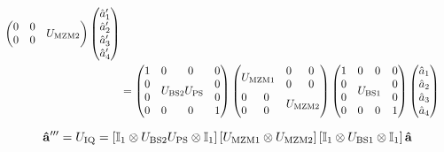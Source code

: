 \begin{equation}
\begin{split}
\begin{pmatrix}
			 0 & 0 & \multicolumn{2}{c}{\multirow{2}{*}{$U_\text{MZM2}$}} \\
			 0 & 0 & & \\
		\end{pmatrix}
		\begin{pmatrix}
			\hat{a}_1^\prime \\
			\hat{a}_2^\prime \\
			\hat{a}_3^\prime \\
			\hat{a}_4^\prime
		\end{pmatrix}
		\\
		&=
		\begin{pmatrix}
			 1 & 0 & 0 & 0 \\
			 0 & \multicolumn{2}{c}{\multirow{2}{*}{$U_\text{BS2}U_\text{PS}$}} & 0 \\
			 0 & & & 0 \\
			 0 & 0 & 0 & 1
		\end{pmatrix}
		\begin{pmatrix}
			 \multicolumn{2}{c}{\multirow{2}{*}{$U_\text{MZM1}$}} & 0 & 0 \\
			 & & 0 & 0 \\
			 0 & 0 & \multicolumn{2}{c}{\multirow{2}{*}{$U_\text{MZM2}$}} \\
			 0 & 0 & & \\
		\end{pmatrix}
		\begin{pmatrix}
			 1 & 0 & 0 & 0 \\
			 0 & \multicolumn{2}{c}{\multirow{2}{*}{$U_\text{BS1}$}} & 0 \\
			 0 & & & 0 \\
			 0 & 0 & 0 & 1
		\end{pmatrix}
		\begin{pmatrix}
			\hat{a}_1 \\
			\hat{a}_2 \\
			\hat{a}_3 \\
			\hat{a}_4
		\end{pmatrix}
	\end{split}
\end{equation}

\begin{equation}
	\vb{\hat{a}}^{\prime\prime\prime}
	=
	U_\text{IQ}
	=
	\left[
		\mathbb{I}_1
		\otimes
		U_\text{BS2}
		U_\text{PS}
		\otimes
		\mathbb{I}_1
	\right]
	\left[
		U_\text{MZM1}
		\otimes
		U_\text{MZM2}
	\right]
	\left[
		\mathbb{I}_1
		\otimes
		U_\text{BS1}
		\otimes
		\mathbb{I}_1
	\right]
	\vb{\hat{a}}
\end{equation}

